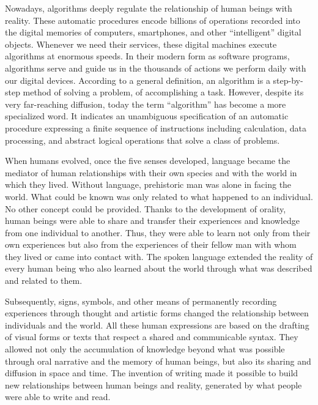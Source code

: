 

%



Nowadays, algorithms deeply regulate the relationship of human beings with reality. These automatic procedures encode billions of operations recorded into the digital memories of computers, smartphones, and other ``intelligent'' digital objects. Whenever we need their services, these digital machines execute \hbox{algorithms} at enormous speeds. In their modern form as software programs, algorithms serve and guide us in the thousands of actions we perform daily with our digital devices. According to a general definition, an algorithm is a step-by-step method of solving a problem, of accomplishing a task. However, despite its very far-reaching diffusion, today the term ``algorithm'' has become a more specialized word. It indicates an unambiguous specification of an automatic procedure expressing a finite sequence of instructions including calculation, data processing, and abstract logical operations that solve a class of problems.

When humans evolved, once the five senses developed, language became the mediator of human relationships with their own species and with the world in which they lived. Without language, prehistoric man was alone in facing the world. What could be known was only related to what happened to an individual. No other concept could be provided. Thanks to the development of orality, human beings were able to share and transfer their experiences and knowledge from one individual to another. Thus, they were able to learn not only from their own experiences but also from the experiences of their fellow man with whom they lived or came into contact with. The spoken language extended the reality of every human being who also learned about the world through what was described and related to them.


Subsequently, signs, symbols, and other means of permanently recording experiences through thought and artistic forms changed the relationship between individuals and the world. All these human expressions are based on the drafting of visual forms or texts that respect a shared and communicable syntax. They allowed not only the accumulation of knowledge beyond what was possible through oral narrative and the memory of human beings, but also its sharing and diffusion in space and time. The invention of writing made it possible to build new relationships between human beings and reality, generated by what people were able to write and read.

